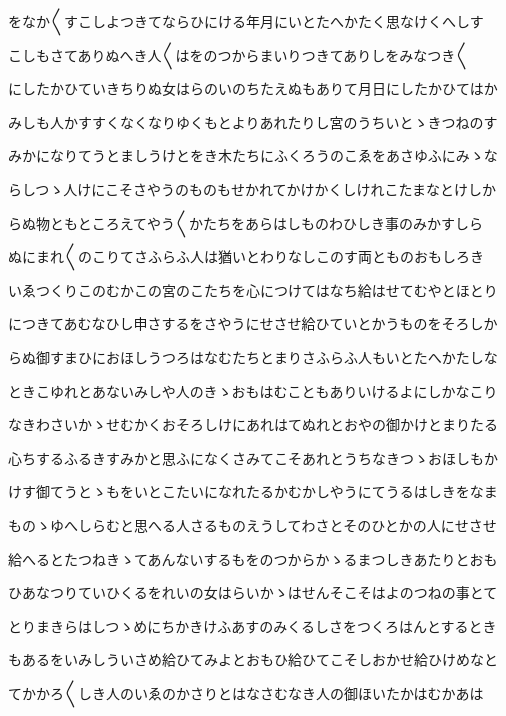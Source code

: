 \documentclass[a4paper,11pt,landscape]{ltjtarticle}
\begin{document}
\par\medskip
をなか〱すこしよつきてならひにける年月にいとたへかたく思なけくへしす
\par\medskip
こしもさてありぬへき人〱はをのつからまいりつきてありしをみなつき〱
\par\medskip
にしたかひていきちりぬ女はらのいのちたえぬもありて月日にしたかひてはか
\par\medskip
みしも人かすすくなくなりゆくもとよりあれたりし宮のうちいとゝきつねのす
\par\medskip
みかになりてうとましうけとをき木たちにふくろうのこゑをあさゆふにみゝな
\par\medskip
らしつゝ人けにこそさやうのものもせかれてかけかくしけれこたまなとけしか
\par\medskip
らぬ物ともところえてやう〱かたちをあらはしものわひしき事のみかすしら
\par\medskip
ぬにまれ〱のこりてさふらふ人は猶いとわりなしこのす両とものおもしろき
\par\medskip
いゑつくりこのむかこの宮のこたちを心につけてはなち給はせてむやとほとり
\par\medskip
につきてあむなひし申さするをさやうにせさせ給ひていとかうものをそろしか
\par\medskip
らぬ御すまひにおほしうつろはなむたちとまりさふらふ人もいとたへかたしな
\par\medskip
ときこゆれとあないみしや人のきゝおもはむこともありいけるよにしかなこり
\par\medskip
なきわさいかゝせむかくおそろしけにあれはてぬれとおやの御かけとまりたる
\par\medskip
心ちするふるきすみかと思ふになくさみてこそあれとうちなきつゝおほしもか
\par\medskip
けす御てうとゝもをいとこたいになれたるかむかしやうにてうるはしきをなま
\par\medskip
ものゝゆへしらむと思へる人さるものえうしてわさとそのひとかの人にせさせ
\par\medskip
給へるとたつねきゝてあんないするもをのつからかゝるまつしきあたりとおも
\par\medskip
ひあなつりていひくるをれいの女はらいかゝはせんそこそはよのつねの事とて
\par\medskip
とりまきらはしつゝめにちかきけふあすのみくるしさをつくろはんとするとき
\par\medskip
もあるをいみしういさめ給ひてみよとおもひ給ひてこそしおかせ給ひけめなと
\par\medskip
てかかろ〱しき人のいゑのかさりとはなさむなき人の御ほいたかはむかあは
\par\medskip
\end{document}
